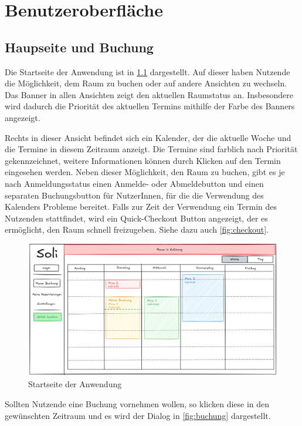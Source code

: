 
\chapter{Benutzeroberfläche}
\label{chap:ui}

\section{Haupseite und Buchung}

Die Startseite der Anwendung ist in \ref{fig:startseite} dargestellt.
Auf dieser haben Nutzende die Möglichkeit, dem Raum zu buchen oder auf andere Ansichten zu wechseln.
Das Banner in allen Ansichten zeigt den aktuellen Raumstatus an.
Insbesondere wird dadurch die Priorität des aktuellen Termins mithilfe der Farbe des Banners angezeigt.

Rechts in dieser Ansicht befindet sich ein Kalender, der die aktuelle Woche und die Termine in diesem Zeitraum anzeigt.
Die Termine sind farblich nach Priorität gekennzeichnet, weitere Informationen können durch Klicken auf den Termin eingesehen werden.
Neben dieser Möglichkeit, den Raum zu buchen, gibt es je nach Anmeldungsstatus einen Anmelde- oder Abmeldebutton und einen separaten Buchungsbutton für NutzerInnen,
für die die Verwendung des Kalenders Probleme bereitet.
Falls zur Zeit der Verwendung ein Termin des Nutzenden stattfindet, wird ein Quick-Checkout Button angezeigt,
der es ermöglicht, den Raum schnell freizugeben.
Siehe dazu auch \ref{fig:checkout}.
\clearpage
\begin{figure}[ht]
    \centering
    \includegraphics[scale=0.15]{figures/ui/startseite}
    \caption{Startseite der Anwendung}
    \label{fig:startseite}
\end{figure}

Sollten Nutzende eine Buchung vornehmen wollen, so klicken diese in den gewünschten Zeitraum
und es wird der Dialog in \ref{fig:buchung} dargestellt.

